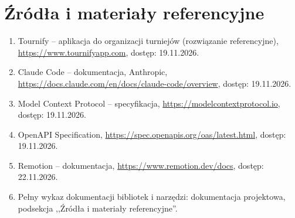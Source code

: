 \documentclass[11pt,a4paper,oneside]{article}
\newif\ifpodpowiedzi
\newcommand{\podpowiedz}[1]{\ifpodpowiedzi\par\begingroup\small\color{hintcolor}\textit{Wskazówka: #1}\par\endgroup\fi}
\begin{document}
\section*{Źródła i materiały referencyjne}
\podpowiedz{Wymień źródła przywołane w sprawozdaniu: publikacje, dokumentację, zbiory danych i inne zasoby. Dla materiałów internetowych podaj tytuł, adres i datę dostępu. Pełny wykaz techniczny może znajdować się w dokumentacji projektowej - wskaż wtedy odpowiednią sekcję. Jeśli nie wykorzystano źródeł zewnętrznych, wpisz tę informację.}
\begin{enumerate}
\item Tournify -- aplikacja do organizacji turniejów (rozwiązanie referencyjne), \url{https://www.tournifyapp.com}, dostęp: 19.11.2026.
\item Claude Code -- dokumentacja, Anthropic, \url{https://docs.claude.com/en/docs/claude-code/overview}, dostęp: 19.11.2026.
\item Model Context Protocol -- specyfikacja, \url{https://modelcontextprotocol.io}, dostęp: 19.11.2026.
\item OpenAPI Specification, \url{https://spec.openapis.org/oas/latest.html}, dostęp: 19.11.2026.
\item Remotion -- dokumentacja, \url{https://www.remotion.dev/docs}, dostęp: 22.11.2026.
\item Pełny wykaz dokumentacji bibliotek i narzędzi: dokumentacja projektowa, podsekcja ,,Źródła i materiały referencyjne''.
\end{enumerate}
\end{document}
